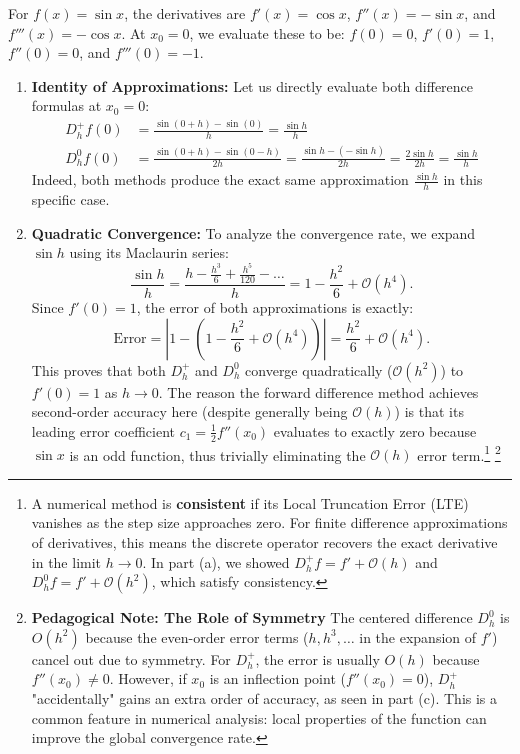 \begin{solution}
For $f(x) = \sin x$, the derivatives are $f'(x) = \cos x$, $f''(x) = -\sin x$, and $f'''(x) = -\cos x$.
At $x_0 = 0$, we evaluate these to be: $f(0) = 0$, $f'(0) = 1$, $f''(0) = 0$, and $f'''(0) = -1$.
\begin{enumerate}
    \item \textbf{Identity of Approximations:}
Let us directly evaluate both difference formulas at $x_0 = 0$:
\begin{align*}
    D_h^+ f(0) &= \frac{\sin(0 + h) - \sin(0)}{h} = \frac{\sin h}{h} \\
    D_h^0 f(0) &= \frac{\sin(0 + h) - \sin(0 - h)}{2h} = \frac{\sin h - (-\sin h)}{2h} = \frac{2 \sin h}{2h} = \frac{\sin h}{h}
\end{align*}
Indeed, both methods produce the exact same approximation $\frac{\sin h}{h}$ in this specific case.
    \item \textbf{Quadratic Convergence:}
To analyze the convergence rate, we expand $\sin h$ using its Maclaurin series:
\[
    \frac{\sin h}{h} = \frac{h - \frac{h^3}{6} + \frac{h^5}{120} - \dots}{h} = 1 - \frac{h^2}{6} + \mathcal{O}(h^4).
\]
Since $f'(0) = 1$, the error of both approximations is exactly:
\[
    \text{Error} = \left| 1 - \left( 1 - \frac{h^2}{6} + \mathcal{O}(h^4) \right) \right| = \frac{h^2}{6} + \mathcal{O}(h^4).
\]
This proves that both $D_h^+$ and $D_h^0$ converge quadratically ($\mathcal{O}(h^2)$) to $f'(0) = 1$ as $h \to 0$. The reason the forward difference method achieves second-order accuracy here (despite generally being $\mathcal{O}(h)$) is that its leading error coefficient $c_1 = \frac{1}{2} f''(x_0)$ evaluates to exactly zero because $\sin x$ is an odd function, thus trivially eliminating the $\mathcal{O}(h)$ error term.\footnote{A numerical method is \textbf{consistent} if its Local Truncation Error (LTE) vanishes as the step size approaches zero. For finite difference approximations of derivatives, this means the discrete operator recovers the exact derivative in the limit $h \to 0$. In part (a), we showed $D_h^+ f = f' + \mathcal{O}(h)$ and $D_h^0 f = f' + \mathcal{O}(h^2)$, which satisfy consistency.} \footnote{\textbf{Pedagogical Note: The Role of Symmetry} The centered difference $D_h^0$ is $O(h^2)$ because the even-order error terms ($h, h^3, \dots$ in the expansion of $f'$) cancel out due to symmetry. For $D_h^+$, the error is usually $O(h)$ because $f''(x_0) \neq 0$. However, if $x_0$ is an inflection point ($f''(x_0) = 0$), $D_h^+$ "accidentally" gains an extra order of accuracy, as seen in part (c). This is a common feature in numerical analysis: local properties of the function can improve the global convergence rate.}
\end{enumerate}
\end{solution}

